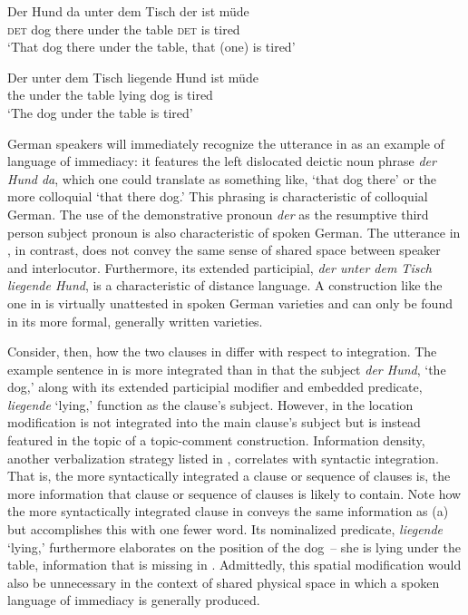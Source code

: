 \ea%
    \label{ex:3:5}
\ea\label{ex:3:5a}
\gll Der Hund  da    unter dem Tisch  der  ist  müde\\
    \textsc{det} dog     there   under the table  \textsc{det}  is   tired\\
\glt     ‘That dog there under the table, that (one) is tired’

\ex\label{ex:3:5b}
\gll Der   unter dem Tisch  liegende   Hund  ist  müde\\
  the   under the table   lying    dog   is  tired\\
\glt ‘The dog under the table is tired’
    \z
\z

\noindent German speakers will immediately recognize the utterance in  as an example of language of immediacy: it features the left dislocated deictic noun phrase \textit{der Hund da}, which one could translate as something like, ‘that dog there’ or the more colloquial ‘that there dog.’ This phrasing is characteristic of colloquial German. The use of the demonstrative pronoun \textit{der} as the resumptive third person subject pronoun is also characteristic of spoken German. The utterance in , in contrast, does not convey the same sense of shared space between speaker and interlocutor. Furthermore, its extended participial, \textit{der unter dem Tisch liegende Hund}, is a characteristic of distance language. A construction like the one in  is virtually unattested in spoken German varieties and can only be found in its more formal, generally written varieties.

Consider, then, how the two clauses in  differ with respect to integration. The example sentence in  is more integrated than  in that the subject \textit{der Hund}, ‘the dog,’ along with its extended participial modifier and embedded predicate, \textit{liegende} ‘lying,’ function as the clause’s subject. However, in  the location modification is not integrated into the main clause’s subject but is instead featured in the topic of a topic-comment construction. Information density, another verbalization strategy listed in , correlates with syntactic integration. That is, the more syntactically integrated a clause or sequence of clauses is, the more information that clause or sequence of clauses is likely to contain. Note how the more syntactically integrated clause in  conveys the same information as (a) but accomplishes this with one fewer word. Its nominalized predicate, \textit{liegende} ‘lying,’ furthermore elaborates on the position of the dog~-- she is lying under the table, information that is missing in . Admittedly, this spatial modification would also be unnecessary in the context of shared physical space in which a spoken language of immediacy is generally produced.

